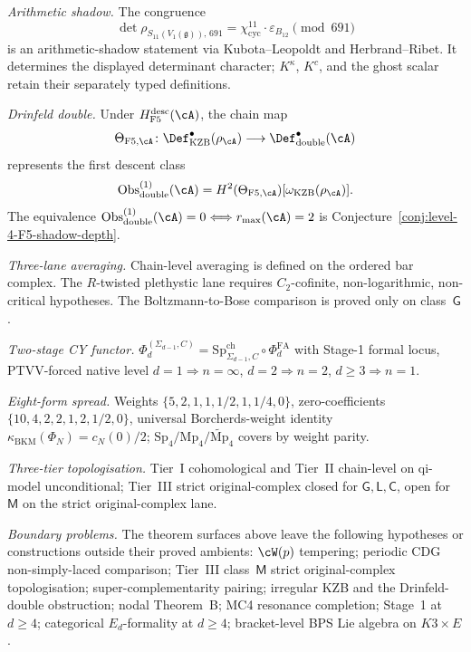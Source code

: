 \smallskip\noindent\emph{Arithmetic shadow.}
The congruence
\[
\det\rho_{S_{11}(V_1(\mathfrak g)),\,691}
 = \chi_{\mathrm{cyc}}^{11}\cdot\varepsilon_{B_{12}}\pmod{691}
\]
is an arithmetic-shadow statement via Kubota--Leopoldt and
Herbrand--Ribet. It determines the displayed determinant character;
$K^\kappa$, $K^c$, and the ghost scalar retain their separately typed
definitions.

\smallskip\noindent\emph{Drinfeld double.}
Under $H_{\mathrm{F5}}^{\mathrm{desc}}(\cA)$, the chain map
\[
 \Theta_{\mathrm{F5},\cA}\colon
 \Def_{\mathrm{KZB}}^\bullet(\rho_\cA)
 \longrightarrow
 \Def_{\mathrm{double}}^\bullet(\cA)
\]
represents the first descent class
\[
 \operatorname{Obs}^{(1)}_{\mathrm{double}}(\cA)
 =H^2(\Theta_{\mathrm{F5},\cA})
  [\omega_{\mathrm{KZB}}(\rho_\cA)].
\]
The equivalence
$\operatorname{Obs}^{(1)}_{\mathrm{double}}(\cA)=0
\Longleftrightarrow r_{\max}(\cA)=2$
is Conjecture~\ref{conj:level-4-F5-shadow-depth}.

\smallskip\noindent\emph{Three-lane averaging.} Chain-level averaging
is defined on the ordered bar complex. The $R$-twisted plethystic lane
requires $C_2$-cofinite, non-logarithmic, non-critical hypotheses. The
Boltzmann-to-Bose comparison is proved only on class~$\mathsf G$.

\smallskip\noindent\emph{Two-stage CY functor.}
$\Phi_d^{(\Sigma_{d-1},C)}
= \mathrm{Sp}^{\mathrm{ch}}_{\Sigma_{d-1},C}\circ\Phi^{\mathrm{FA}}_d$
with Stage-1 formal locus, PTVV-forced native level
$d=1\Rightarrow n=\infty$, $d=2\Rightarrow n=2$, $d\ge 3\Rightarrow n=1$.

\smallskip\noindent\emph{Eight-form spread.} Weights
$\{5,2,1,1,1/2,1,1/4,0\}$, zero-coefficients
$\{10,4,2,2,1,2,1/2,0\}$, universal Borcherds-weight identity
$\kappa_{\mathrm{BKM}}(\Phi_N)=c_N(0)/2$;
$\mathrm{Sp}_4/\mathrm{Mp}_4/\widetilde{\mathrm{Mp}}_4$ covers by
weight parity.

\smallskip\noindent\emph{Three-tier topologisation.} Tier~I
cohomological and Tier~II chain-level on qi-model unconditional;
Tier~III strict original-complex closed for $\mathsf G,\mathsf L,\mathsf C$,
open for $\mathsf M$ on the strict original-complex lane.

\smallskip\noindent\emph{Boundary problems.}
The theorem surfaces above leave the following hypotheses or
constructions outside their proved ambients:
$\cW(p)$ tempering; periodic CDG non-simply-laced comparison;
Tier~III class~$\mathsf M$ strict original-complex topologisation;
super-complementarity pairing; irregular KZB and the Drinfeld-double
obstruction; nodal Theorem~B; MC4 resonance completion; Stage~1 at
$d\ge4$; categorical $E_d$-formality at $d\ge4$; bracket-level BPS Lie
algebra on $K3\times E$.

